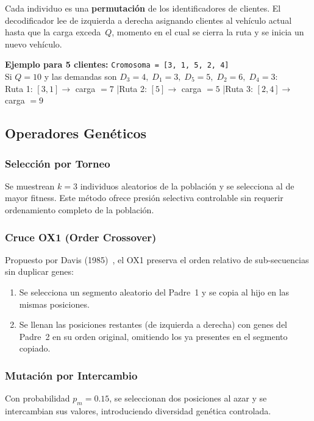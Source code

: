 \documentclass[12pt,letterpaper]{article}
\begin{document}
Cada individuo es una \textbf{permutación} de los identificadores de clientes. El decodificador lee de izquierda a derecha asignando clientes al vehículo actual hasta que la carga exceda~$Q$, momento en el cual se cierra la ruta y se inicia un nuevo vehículo.

\begin{notebox}
\textbf{Ejemplo para 5 clientes:} \texttt{Cromosoma = [3, 1, 5, 2, 4]}\\[4pt]
Si $Q = 10$ y las demandas son $D_3=4,\;D_1=3,\;D_5=5,\;D_2=6,\;D_4=3$:\\[4pt]
Ruta 1: $[3, 1] \rightarrow$ carga $= 7$ \quad|\quad Ruta 2: $[5] \rightarrow$ carga $= 5$ \quad|\quad Ruta 3: $[2, 4] \rightarrow$ carga $= 9$
\end{notebox}

\subsection{Operadores Genéticos}

\subsubsection{Selección por Torneo}
Se muestrean $k=3$ individuos aleatorios de la población y se selecciona al de mayor fitness. Este método ofrece presión selectiva controlable sin requerir ordenamiento completo de la población.

\subsubsection{Cruce OX1 (Order Crossover)}
Propuesto por Davis (1985)~\cite{davis1985}, el OX1 preserva el orden relativo de sub-secuencias sin duplicar genes:

\begin{restrictionbox}
\begin{enumerate}
    \item Se selecciona un segmento aleatorio del Padre~1 y se copia al hijo en las mismas posiciones.
    \item Se llenan las posiciones restantes (de izquierda a derecha) con genes del Padre~2 en su orden original, omitiendo los ya presentes en el segmento copiado.
\end{enumerate}
\end{restrictionbox}

\subsubsection{Mutación por Intercambio}
Con probabilidad $p_m = 0.15$, se seleccionan dos posiciones al azar y se intercambian sus valores, introduciendo diversidad genética controlada.
\end{document}
